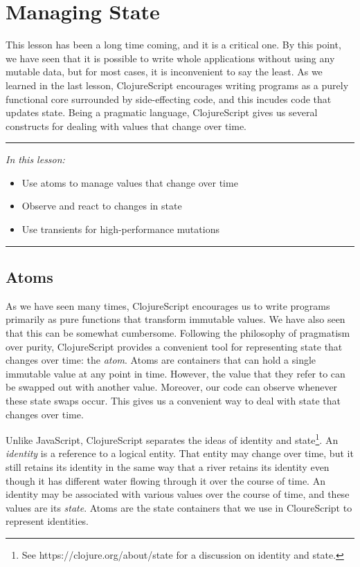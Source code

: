 \documentclass[10pt,twoside,openright]{memoir}
\begin{document}
\chapter{Managing State}

This lesson has been a long time coming, and it is a critical one. By
this point, we have seen that it is possible to write whole applications
without using any mutable data, but for most cases, it is inconvenient
to say the least. As we learned in the last lesson, ClojureScript
encourages writing programs as a purely functional core surrounded by
side-effecting code, and this incudes code that updates state. Being a
pragmatic language, ClojureScript gives us several constructs for
dealing with values that change over time.

\begin{center}\rule{0.5\linewidth}{0.5pt}\end{center}

\emph{In this lesson:}

\begin{itemize}
\tightlist
\item
  Use atoms to manage values that change over time
\item
  Observe and react to changes in state
\item
  Use transients for high-performance mutations
\end{itemize}

\begin{center}\rule{0.5\linewidth}{0.5pt}\end{center}


\section{Atoms}

As we have seen many times, ClojureScript encourages us to write
programs primarily as pure functions that transform immutable values. We
have also seen that this can be somewhat cumbersome. Following the
philosophy of pragmatism over purity, ClojureScript provides a
convenient tool for representing state that changes over time: the
\emph{atom}. Atoms are containers that can hold a single immutable value
at any point in time. However, the value that they refer to can be
swapped out with another value. Moreover, our code can observe whenever
these state swaps occur. This gives us a convenient way to deal with
state that changes over time.

Unlike JavaScript, ClojureScript separates the ideas of identity and
state\footnote{See https://clojure.org/about/state for a discussion on
  identity and state.}. An \emph{identity} is a reference to a logical
entity. That entity may change over time, but it still retains its
identity in the same way that a river retains its identity even though
it has different water flowing through it over the course of time. An
identity may be associated with various values over the course of time,
and these values are its \emph{state}. Atoms are the state containers
that we use in CloureScript to represent identities.
\end{document}
